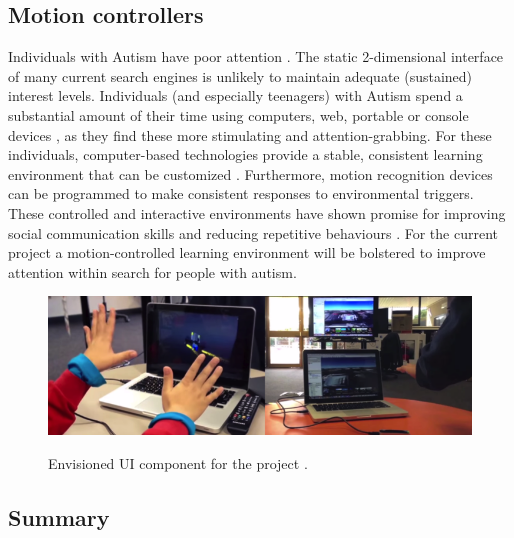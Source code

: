 \documentclass[a4paper, 11pt]{article}
\begin{document}
\subsection{Motion controllers}
Individuals with Autism have poor attention \cite{attention}. The static 2-dimensional interface of many current search engines is unlikely to maintain adequate (sustained) interest levels. Individuals (and especially teenagers) with Autism spend a substantial amount of their time using computers, web, portable or console devices \cite{Shane and Albert}, as they find these more stimulating and attention-grabbing. For these individuals, computer-based technologies provide a stable, consistent learning environment that can be customized \cite{moore}. Furthermore, motion recognition devices can be programmed to make consistent responses to environmental triggers. These controlled and interactive environments have shown promise for improving social communication skills and reducing repetitive behaviours \cite{gameshealth}. For the current project a motion-controlled learning environment will be bolstered to improve attention within search for people with autism. 

\begin{figure}[H]
\begin{center}
\includegraphics[scale=0.5]{vision}\\
\caption{Envisioned UI component for the project \cite{leap}.}
\label{vision}
\end{center}
\end{figure}


\subsection{Summary}
\end{document}
